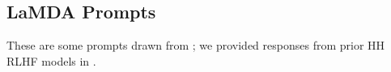 \documentclass[english]{article}
\renewcommand\>{\rangle}
\begin{document}




\subsection{LaMDA Prompts}

These are some prompts drawn from \cite{LaMDA}; we provided  responses from prior HH RLHF models in \cite{bai2022training}.
\end{document}
